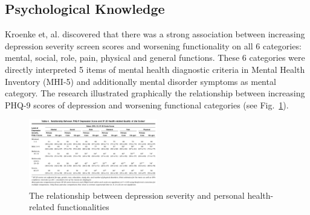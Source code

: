 \documentclass[10pt,journal,compsoc]{IEEEtran}
\begin{document}
\subsection{Psychological Knowledge}
Kroenke et, al. \cite{Kroenke} discovered that there was a strong association between increasing depression severity screen scores and worsening functionality on all 6 categories: mental, social, role, pain, physical and general functions. These 6 categories were directly interpreted 5 items of mental health diagnostic criteria in Mental Health Inventory (MHI-5) and additionally mental disorder symptoms as mental category. The research illustrated graphically the relationship between increasing PHQ-9 scores of depression and worsening functional categories (see Fig.~\ref{fig2}). 
\begin{figure}[h]
\includegraphics[width=0.5\textwidth]{phq-9.png}
\caption{The relationship between depression severity and personal health-related functionalities\cite{Kroenke}} \label{fig2}
\end{figure}
\end{document}
